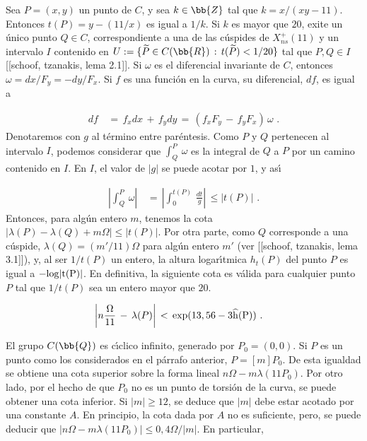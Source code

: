 Sea $P=(x,y)$ un punto de $C$, y sea $k\in\bb{Z}$ tal que
$k=x/(xy-11)$. Entonces $t(P)=y-(11/x)$ es igual a $1/k$. Si $k$ es
mayor que $20$, exite un \'{u}nico punto $Q\in C$, correspondiente a
una de las c\'{u}spides de $X_{ns}^{+}(11)$ y un intervalo $I$ contenido
en $U:=\{\widetilde{P}\in C(\bb{R})\,:\,t(\widetilde{P})<1/20\}$
tal que $P,Q\in I$ [[schoof, tzanakis, lema 2.1]]. Si $\omega$ es el
diferencial invariante de $C$, entonces $\omega=dx/F_{y}=-dy/F_{x}$.
Si $f$ es una funci\'{o}n en la curva, su diferencial, $df$, es igual a

\begin{align*}
df & \,=\,f_{x}dx\,+\,f_{y}dy\,=\,
\left(f_{x}F_{y}\,-\,f_{y}F_{x}\right)\,\omega\text{ .}
\end{align*}
Denotaremos con $g$ al t\'{e}rmino entre par\'{e}ntesis.
Como $P$ y $Q$ pertenecen al intervalo $I$, podemos considerar
que $\int_{Q}^{P}\,\omega$ es la integral de $Q$ a $P$ por
un camino contenido en $I$. En $I$, el valor de $|g|$ se puede
acotar por $1$, y as\'{\i}

\begin{align*}
\left|\int_{Q}^{P}\,\omega\right| & \,=\,
\left|\int_{0}^{t(P)}\,\frac{dt}{g}\right|\,\leq|t(P)|
\text{ .}
\end{align*}
Entonces, para alg\'{u}n entero $m$, tenemos la cota
$|\lambda(P)-\lambda(Q)+m\Omega|\leq|t(P)|$. Por otra parte, como
$Q$ corresponde a una c\'{u}spide, $\lambda(Q)=(m'/11)\Omega$
para alg\'{u}n entero $m'$ (ver [[schoof, tzanakis, lema 3.1]]), y,
al ser $1/t(P)$ un entero, la altura logar\'{\i}tmica $h_{t}(P)$ del
punto $P$ es igual a $-\rm{log}|t(P)|$. En definitiva, la siguiente cota
es v\'{a}lida para cualquier punto $P$ tal que $1/t(P)$ sea un entero
mayor que $20$.

\begin{align*}
\left| n\frac{\Omega}{11}\,-\,\lambda(P) \right| &
\,<\,\rm{exp}(13,56-3\widehat{h}(P))\text{ .}
\end{align*}

El grupo $C(\bb{Q})$ es c\'{\i}clico infinito, generado por
$P_{0}=(0,0)$. Si $P$ es un punto como los considerados en el
p\'{a}rrafo anterior, $P=[m]P_{0}$. De esta igualdad se obtiene una
cota superior sobre la forma lineal $n\Omega-m\lambda(11P_{0})$. Por
otro lado, por el hecho de que $P_{0}$ no es un punto de torsi\'{o}n
de la curva, se puede obtener una cota inferior.
Si $|m|\geq 12$, se deduce que $|m|$ debe estar acotado por una
constante $A$. En principio, la cota dada por $A$ no es suficiente,
pero, se puede deducir que
$|n\Omega-m\lambda(11P_{0})|\leq 0,4\Omega/|m|$. En particular,

